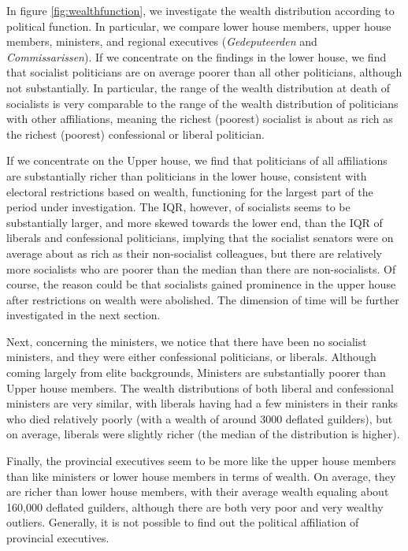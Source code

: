     In figure \ref{fig:wealthfunction}, we investigate the wealth distribution according to political function. In particular, we compare lower house members, upper house members, ministers, and regional executives (\textit{Gedeputeerden} and \textit{Commissarissen}). If we concentrate on the findings in the lower house, we find that socialist politicians are on average poorer than all other politicians, although not substantially. In particular, the range of the wealth distribution at death of socialists is very comparable to the range of the wealth distribution of politicians with other affiliations, meaning the richest (poorest) socialist is about as rich as the richest (poorest) confessional or liberal politician. 
    
    If we concentrate on the Upper house, we find that politicians of all affiliations are substantially richer than politicians in the lower house, consistent with electoral restrictions based on wealth, functioning for the largest part of the period under investigation. \autocite{moes1994lijsten} The IQR, however, of socialists seems to be substantially larger, and more skewed towards the lower end, than the IQR of liberals and confessional politicians, implying that the socialist senators were on average about as rich as their non-socialist colleagues, but there are relatively more socialists who are poorer than the median than there are non-socialists. Of course, the reason could be that socialists gained prominence in the upper house after restrictions on wealth were abolished. The dimension of time will be further investigated in the next section. 
    
    Next, concerning the ministers, we notice that there have been no socialist ministers, and they were either confessional politicians, or liberals. Although coming largely from elite backgrounds, Ministers are substantially poorer than Upper house members.\autocite{secker1991ministers} The wealth distributions of both liberal and confessional ministers are very similar, with liberals having had a few ministers in their ranks who died relatively poorly (with a wealth of around 3000 deflated guilders), but on average, liberals were slightly richer (the median of the distribution is higher). 
    
    Finally, the provincial executives seem to be more like the upper house members than like ministers or lower house members in terms of wealth. On average, they are richer than lower house members, with their average wealth equaling about 160,000 deflated guilders, although there are both very poor and very wealthy outliers. Generally, it is not possible to find out the political affiliation of provincial executives. 
    
